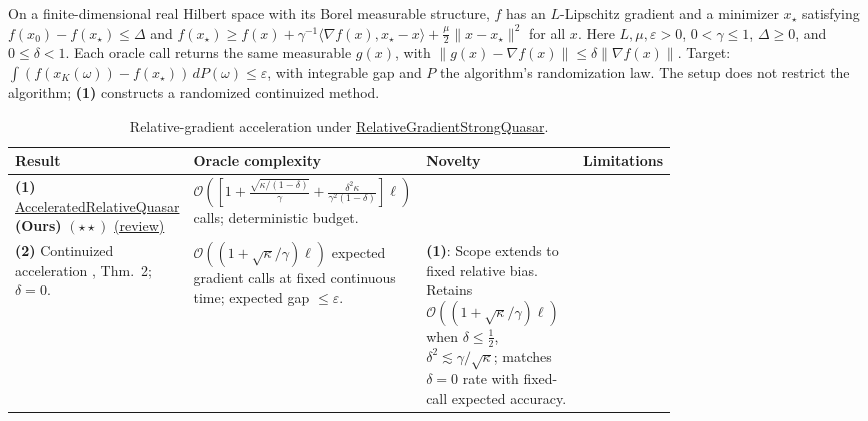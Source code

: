 \begin{table}[tp]
\centering
\caption{Relative-gradient acceleration under \href{https://github.com/k3nfalt/longtails/blob/main/LongTails/Setups/RelativeGradientStrongQuasar.lean}{RelativeGradientStrongQuasar}.}\label{tab:RelativeGradientStrongQuasar}
\parbox{\linewidth}{\footnotesize On a finite-dimensional real Hilbert space with its Borel measurable structure, $f$ has an $L$-Lipschitz gradient and a minimizer $x_\star$ satisfying $f(x_0)-f(x_\star)\le\Delta$ and $f(x_\star)\ge f(x)+\gamma^{-1}\langle\nabla f(x),x_\star-x\rangle+\frac{\mu}{2}\|x-x_\star\|^2$ for all $x$. Here $L,\mu,\varepsilon>0$, $0<\gamma\le1$, $\Delta\ge0$, and $0\le\delta<1$. Each oracle call returns the same measurable $g(x)$, with $\|g(x)-\nabla f(x)\|\le\delta\|\nabla f(x)\|$. Target: $\int(f(x_K(\omega))-f(x_\star))\,dP(\omega)\le\varepsilon$, with integrable gap and $P$ the algorithm's randomization law. The setup does not restrict the algorithm; \textbf{(1)} constructs a randomized continuized method.}\par\smallskip
\begin{threeparttable}
\footnotesize
\setlength{\tabcolsep}{4pt}\renewcommand{\arraystretch}{1.25}
\begin{tabularx}{\linewidth}{@{}>{\raggedright\arraybackslash}p{0.20\linewidth}>{\raggedright\arraybackslash}p{0.32\linewidth}>{\raggedright\arraybackslash}p{0.25\linewidth}>{\raggedright\arraybackslash}X@{}}
\toprule
\textbf{Result} & \textbf{Oracle complexity} & \textbf{Novelty} & \textbf{Limitations} \\
\midrule
\textbf{(1)} \href{https://github.com/k3nfalt/longtails/blob/main/LongTails/Theorems/AcceleratedRelativeQuasar.lean}{Accelerated\allowbreak Relative\allowbreak Quasar} \textbf{(Ours)} $(\star\star)$ \href{https://github.com/k3nfalt/longtails/blob/main/scripts/reviews/AcceleratedRelativeQuasar.md}{(review)}
& $\mathcal{O}\!\left(\left[1+\frac{\sqrt{\kappa/(1-\delta)}}{\gamma}+\frac{\delta^2\kappa}{\gamma^2(1-\delta)}\right]\ell\right)$ calls; deterministic budget.
& & \\
\midrule[1.2pt]
\textbf{(2)} Continuized acceleration \citep{rqWangWibisono2023}, Thm.~2; $\delta=0$.
& $\mathcal{O}\!\left((1+\sqrt{\kappa}/\gamma)\ell\right)$ expected gradient calls at fixed continuous time; expected gap $\le\varepsilon$.
& \textbf{(1)}: Scope extends to fixed relative bias. Retains $\mathcal{O}((1+\sqrt\kappa/\gamma)\ell)$ when $\delta\le\frac12$, $\delta^2\lesssim\gamma/\sqrt\kappa$; matches $\delta=0$ rate with fixed-call expected accuracy.

\end{tabularx}
\end{threeparttable}
\end{table}
